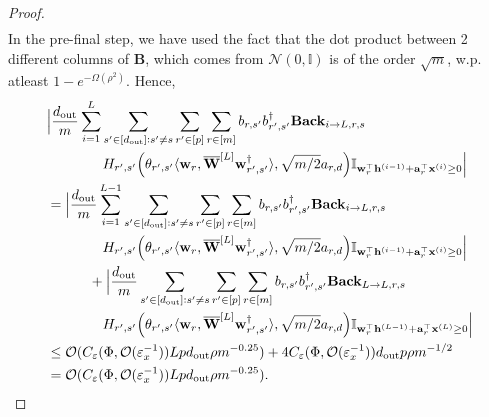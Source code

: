 \begin{proof}
\begin{align*}
			\end{align*}
			In the pre-final step, we have used the fact that the dot product between 2 different columns of $\mathbf{B}$, which comes from $\mathcal{N}(0, \mathbb{I})$ is of the order $\sqrt{m}$, w.p. atleast $1-e^{-\Omega(\rho^2)}$.
			\endgroup
			Hence, 
			\begingroup \allowdisplaybreaks
			\begin{align*}
				&\Big|\frac{d_{\mathrm{out}} }{m} \sum_{i=1}^{L}  \sum_{s' \in [d_{\mathrm{out}} ]: s' \ne s} \sum_{r' \in [p]} \sum_{r \in [m]}  b_{r, s'} b_{r', s'}^{\dagger} \mathbf{Back}_{i \to L, r, s} \\& \quad \quad \quad \quad H_{r', s'}\Big(\theta_{r', s'} \langle \mathbf{w}_{r}, \overline{\mathbf{W}}^{[L]} \mathbf{w}_{r', s'}^{\dagger}\rangle , \sqrt{m/2} a_{r, d}\Big) \mathbb{I}_{\mathbf{w}_r^{\top} \mathbf{h}^{(i-1)} + \mathbf{a}_r^{\top} \mathbf{x}^{(i)} \ge 0}\Big| 
				\\& = \Big|\frac{d_{\mathrm{out}} }{m} \sum_{i=1}^{L-1}  \sum_{s' \in [d_{\mathrm{out}} ]: s' \ne s} \sum_{r' \in [p]} \sum_{r \in [m]}  b_{r, s'} b_{r', s'}^{\dagger} \mathbf{Back}_{i \to L, r, s} \\& \quad \quad \quad \quad H_{r', s'}\Big(\theta_{r', s'} \langle \mathbf{w}_{r}, \overline{\mathbf{W}}^{[L]} \mathbf{w}_{r', s'}^{\dagger}\rangle , \sqrt{m/2} a_{r, d}\Big) \mathbb{I}_{\mathbf{w}_r^{\top} \mathbf{h}^{(i-1)} + \mathbf{a}_r^{\top} \mathbf{x}^{(i)} \ge 0}\Big| 
				\\ &\quad \quad \quad + \Big|\frac{d_{\mathrm{out}} }{m}   \sum_{s' \in [d_{\mathrm{out}} ]: s' \ne s} \sum_{r' \in [p]} \sum_{r \in [m]}  b_{r, s'} b_{r', s'}^{\dagger} \mathbf{Back}_{L \to L, r, s} \\& \quad \quad \quad \quad H_{r', s'}\Big(\theta_{r', s'} \langle \mathbf{w}_{r}, \overline{\mathbf{W}}^{[L]} \mathbf{w}_{r', s'}^{\dagger}\rangle , \sqrt{m/2} a_{r, d}\Big) \mathbb{I}_{\mathbf{w}_r^{\top} \mathbf{h}^{(L-1)} + \mathbf{a}_r^{\top} \mathbf{x}^{(L)} \ge 0}\Big|
				\\&\le  \mathcal{O}(C_\varepsilon(\Phi, \mathcal{O}( \varepsilon_x^{-1})) L p d_{\mathrm{out}} \rho m^{-0.25}) + 4 C_\varepsilon(\Phi, \mathcal{O}( \varepsilon_x^{-1}))  d_{\mathrm{out}} p \rho m^{-1/2} \\&= \mathcal{O}(C_\varepsilon(\Phi, \mathcal{O}( \varepsilon_x^{-1})) L p d_{\mathrm{out}} \rho m^{-0.25}).
			\end{align*}
			\endgroup
		\end{proof}
		
